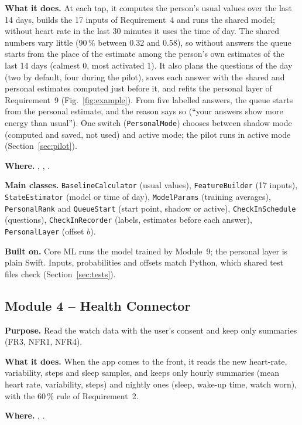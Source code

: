 \documentclass[conference]{IEEEtran}
\newcommand{\field}[1]{\noindent\textbf{#1}}
\begin{document}
\field{What it does.} At each tap, it computes the person's usual values over the last 14 days, builds the 17 inputs of Requirement~4 and runs the shared model; without heart rate in the last 30 minutes it uses the time of day. The shared numbers vary little (90\,\% between 0.32 and 0.58), so without answers the queue starts from the place of the estimate among the person's own estimates of the last 14 days (calmest 0, most activated 1). It also plans the questions of the day (two by default, four during the pilot), saves each answer with the shared and personal estimates computed just before it, and refits the personal layer of Requirement~9 (Fig.~\ref{fig:example}). From five labelled answers, the queue starts from the personal estimate, and the reason says so (``your answers show more energy than usual''). One switch (\texttt{PersonalMode}) chooses between shadow mode (computed and saved, not used) and active mode; the pilot runs in active mode (Section~\ref{sec:pilot}).

\field{Where.} , , .

\field{Main classes.} \texttt{BaselineCalculator} (usual values), \texttt{FeatureBuilder} (17 inputs), \texttt{StateEstimator} (model or time of day), \texttt{ModelParams} (training averages), \texttt{PersonalRank} and \texttt{QueueStart} (start point, shadow or active), \texttt{CheckInSchedule} (questions), \texttt{CheckInRecorder} (labels, estimates before each answer), \texttt{PersonalLayer} (offset $b$).

\field{Built on.} Core ML runs the model trained by Module~9; the personal layer is plain Swift. Inputs, probabilities and offsets match Python, which shared test files check (Section~\ref{sec:tests}).

\subsection{Module 4 -- Health Connector}
\field{Purpose.} Read the watch data with the user's consent and keep only summaries (FR3, NFR1, NFR4).

\field{What it does.} When the app comes to the front, it reads the new heart-rate, variability, steps and sleep samples, and keeps only hourly summaries (mean heart rate, variability, steps) and nightly ones (sleep, wake-up time, watch worn), with the 60\,\% rule of Requirement~2.

\field{Where.} , .
\end{document}
